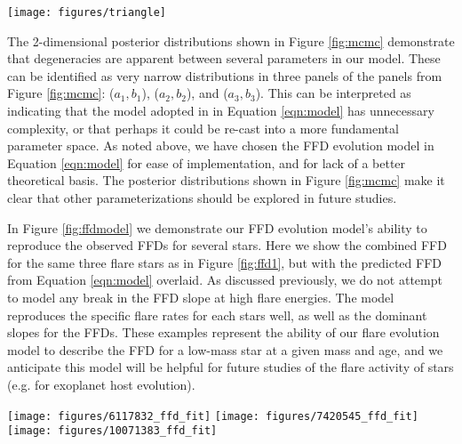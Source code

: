 \documentclass[preprint2]{aastex62}
\begin{document}
\begin{figure*}[!t]
\centering
\texttt{[image: figures/triangle]}
\caption{
The standard MCMC sampler result {\tt corner} plot, showing the 1- and 2-dimensional posterior distributions for each free parameter in Eqn. \ref{eqn:model}. The density of points and contours correlate with the posterior probability distribution from a 100,000-step run of the {\tt emcee} sampler. Degeneracies are apparent between several parameters, seen here as very narrow distributions in three panels ($a_1, b_1$), ($a_2, b_2$), and ($a_3, b_3$), indicating our chosen model in Eqn. \ref{eqn:model} may have unnecessary complexity.
}
\label{fig:mcmc}
\end{figure*}


The 2-dimensional posterior distributions shown in Figure \ref{fig:mcmc} demonstrate that degeneracies are apparent between several parameters in our model. These can be identified as very narrow distributions in three panels of the panels from Figure \ref{fig:mcmc}: ($a_1, b_1$), ($a_2, b_2$), and ($a_3, b_3$). This can be interpreted as indicating that the model adopted in in Equation \ref{eqn:model} has unnecessary complexity, or that perhaps it could be re-cast into a more fundamental parameter space. As noted above, we have chosen the FFD evolution model in Equation \ref{eqn:model} for ease of implementation, and for lack of a better theoretical basis. The posterior distributions shown in Figure \ref{fig:mcmc} make it clear that other parameterizations should be explored in future studies.




In Figure \ref{fig:ffdmodel} we demonstrate our FFD evolution model's ability to reproduce the observed FFDs for several stars. Here we show the combined FFD for the same three flare stars as in Figure \ref{fig:ffd1}, but with the predicted FFD from Equation \ref{eqn:model} overlaid. As discussed previously, we do not attempt to model any break in the FFD slope at high flare energies. The model reproduces the specific flare rates for each stars well, as well as the dominant slopes for the FFDs. These examples represent the ability of our flare evolution model to describe the FFD for a low-mass star at a given mass and age, and we anticipate this model will be helpful for future studies of the flare activity of stars (e.g. for exoplanet host evolution).



\begin{figure*}[!t]
\centering
\texttt{[image: figures/6117832\_ffd\_fit]}
\texttt{[image: figures/7420545\_ffd\_fit]}
\texttt{[image: figures/10071383\_ffd\_fit]}
\caption{
Flare frequency distributions as shown from Figure \ref{fig:ffd1} (black line), but with the final flare activity model from Equation \ref{eqn:model} evaluated for each star's mass and age (red line). Note this model was not fit for each star's FFD individually, but instead was fit to our entire sample.}
\label{fig:ffdmodel}
\end{figure*}
\end{document}
